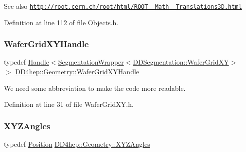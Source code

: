 \begin{DoxySeeAlso}{See also}
\href{http://root.cern.ch/root/html/ROOT__Math__Translations3D.html}{\tt http\+://root.\+cern.\+ch/root/html/\+R\+O\+O\+T\+\_\+\+\_\+\+Math\+\_\+\+\_\+\+Translations3\+D.\+html} 
\end{DoxySeeAlso}


Definition at line 112 of file Objects.\+h.

\hypertarget{namespace_d_d4hep_1_1_geometry_a867af80aa83c181772e515bb22a1de35}{}\label{namespace_d_d4hep_1_1_geometry_a867af80aa83c181772e515bb22a1de35} 
\subsubsection{\texorpdfstring{Wafer\+Grid\+X\+Y\+Handle}{WaferGridXYHandle}}
{\footnotesize\ttfamily typedef \hyperlink{class_d_d4hep_1_1_handle}{Handle}$<$\hyperlink{class_d_d4hep_1_1_geometry_1_1_segmentation_wrapper}{Segmentation\+Wrapper}$<$\hyperlink{class_d_d4hep_1_1_d_d_segmentation_1_1_wafer_grid_x_y}{D\+D\+Segmentation\+::\+Wafer\+Grid\+XY}$>$ $>$ \hyperlink{namespace_d_d4hep_1_1_geometry_a867af80aa83c181772e515bb22a1de35}{D\+D4hep\+::\+Geometry\+::\+Wafer\+Grid\+X\+Y\+Handle}}



We need some abbreviation to make the code more readable. 



Definition at line 31 of file Wafer\+Grid\+X\+Y.\+h.

\hypertarget{namespace_d_d4hep_1_1_geometry_ab195c63789d4928d291d3b5522151aaa}{}\label{namespace_d_d4hep_1_1_geometry_ab195c63789d4928d291d3b5522151aaa} 
\subsubsection{\texorpdfstring{X\+Y\+Z\+Angles}{XYZAngles}}
{\footnotesize\ttfamily typedef \hyperlink{namespace_d_d4hep_1_1_geometry_a55083902099d03506c6db01b80404900}{Position} \hyperlink{namespace_d_d4hep_1_1_geometry_ab195c63789d4928d291d3b5522151aaa}{D\+D4hep\+::\+Geometry\+::\+X\+Y\+Z\+Angles}}



